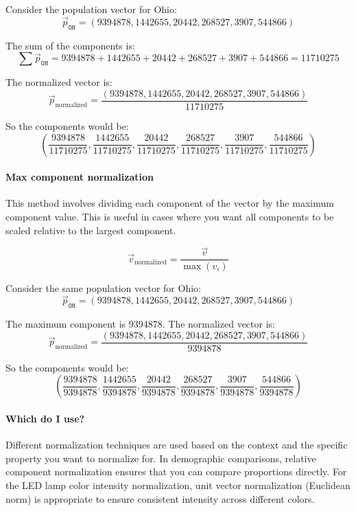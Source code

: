 \documentclass{ximera}
\begin{document}
\begin{example}
Consider the population vector for Ohio:
\[ \vec{p}_{\texttt{OH}} = (9394878, 1442655, 20442, 268527, 3907, 544866) \]

The sum of the components is:
\[ \sum \vec{p}_{\texttt{OH}} = 9394878 + 1442655 + 20442 + 268527 + 3907 + 544866 = 11710275 \]

The normalized vector is:
\[ \vec{p}_{\text{normalized}} = \frac{(9394878, 1442655, 20442, 268527, 3907, 544866)}{11710275} \]

So the components would be:
\[ \left(\frac{9394878}{11710275}, \frac{1442655}{11710275}, \frac{20442}{11710275}, \frac{268527}{11710275}, \frac{3907}{11710275}, \frac{544866}{11710275}\right) \]
\end{example}






\paragraph{Max component normalization}

This method involves dividing each component of the vector by the maximum component value. This is useful in cases where you want all components to be scaled relative to the largest component.

\[ \vec{v}_{\text{normalized}} = \frac{\vec{v}}{\max(v_i)} \]

\begin{example}
Consider the same population vector for Ohio:
\[ \vec{p}_{\texttt{OH}} = (9394878, 1442655, 20442, 268527, 3907, 544866) \]

The maximum component is 9394878. The normalized vector is:
\[ \vec{p}_{\text{normalized}} = \frac{(9394878, 1442655, 20442, 268527, 3907, 544866)}{9394878} \]

So the components would be:
\[ \left(\frac{9394878}{9394878}, \frac{1442655}{9394878}, \frac{20442}{9394878}, \frac{268527}{9394878}, \frac{3907}{9394878}, \frac{544866}{9394878}\right) \]
\end{example}
\paragraph{Which do I use?}
Different normalization techniques are used based on the context and
the specific property you want to normalize for. In demographic
comparisons, relative component normalization ensures that you can
compare proportions directly. For the LED lamp color intensity
normalization, unit vector normalization (Euclidean norm) is
appropriate to ensure consistent intensity across different colors.
\end{document}
